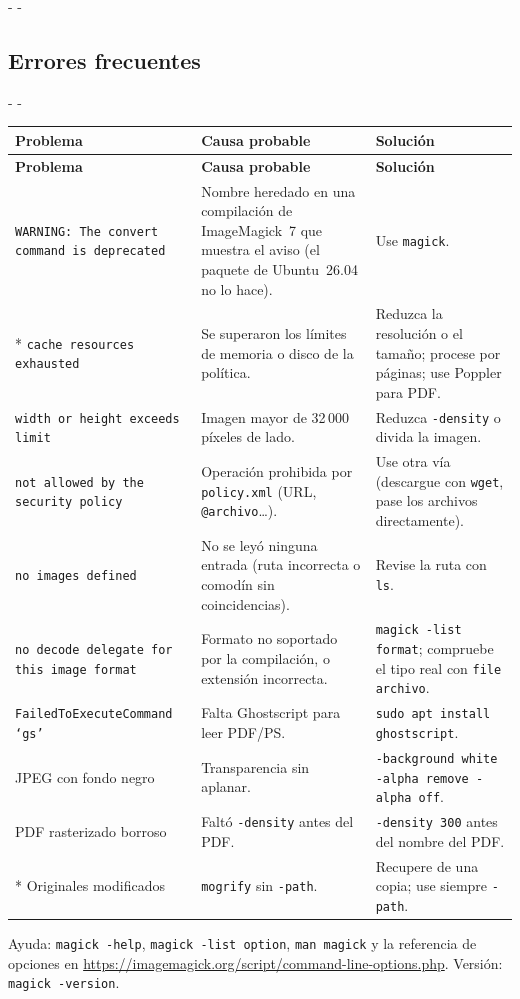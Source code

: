 \documentclass[11pt,a4paper]{article}
\makeatletter
\newcommand{\necesitaespacio}[1]{\par\penalty-100\begingroup
	\setlength{\dimen@}{#1}\dimen@ii\pagegoal\advance\dimen@ii-\pagetotal
	\ifdim\dimen@>\dimen@ii\ifdim\dimen@ii>\z@\vfil\fi\penalty-\@M\fi\endgroup}
\newenvironment{errores}{%
	\par\begingroup\small
	\begin{longtable}{L{4.1cm}L{4.9cm}L{6.0cm}}
		\toprule\rowcolor{tablacab}\cab{Problema} & \cab{Causa probable} & \cab{Solución} \\ \midrule
		\endfirsthead
		\toprule\rowcolor{tablacab}\cab{Problema} & \cab{Causa probable} & \cab{Solución} \\ \midrule
		\endhead
		\bottomrule
		\endfoot}
	{\end{longtable}\endgroup}
\newcommand{\cmd}[1]{\texttt{\textcolor{colcmd}{#1}}}      %
\newcommand{\opt}[1]{\texttt{\textcolor{colopt}{#1}}}      %
\newcommand{\arch}[1]{\texttt{\textcolor{colarch}{#1}}}    %
\newcommand{\cab}[1]{\textbf{#1}}
\makeatother
\begin{document}
	\necesitaespacio{14\baselineskip}
	\subsection{Errores frecuentes}
	
	\necesitaespacio{10\baselineskip}
	\begin{errores}
		\texttt{WARNING: The convert command is deprecated} & Nombre heredado en una compilación de ImageMagick~7 que muestra el aviso (el paquete de Ubuntu~26.04 no lo hace). & Use \cmd{magick}.\\*
		\texttt{cache resources exhausted} & Se superaron los límites de memoria o disco de la política. & Reduzca la resolución o el tamaño; procese por páginas; use Poppler para PDF.\\
		\texttt{width or height exceeds limit} & Imagen mayor de 32\,000 píxeles de lado. & Reduzca \opt{-density} o divida la imagen.\\
		\texttt{not allowed by the security policy} & Operación prohibida por \arch{policy.xml} (URL, \arch{@archivo}\ldots). & Use otra vía (descargue con \cmd{wget}, pase los archivos directamente).\\
		\texttt{no images defined} & No se leyó ninguna entrada (ruta incorrecta o comodín sin coincidencias). & Revise la ruta con \cmd{ls}.\\
		\texttt{no decode delegate for this image format} & Formato no soportado por la compilación, o extensión incorrecta. & \cmd{magick -list format}; compruebe el tipo real con \cmd{file archivo}.\\
		\texttt{FailedToExecuteCommand `gs'} & Falta Ghostscript para leer PDF/PS. & \cmd{sudo apt install ghostscript}.\\
		JPEG con fondo negro & Transparencia sin aplanar. & \opt{-background white -alpha remove -alpha off}.\\
		PDF rasterizado borroso & Faltó \opt{-density} antes del PDF. & \opt{-density 300} antes del nombre del PDF.\\*
		Originales modificados & \cmd{mogrify} sin \opt{-path}. & Recupere de una copia; use siempre \opt{-path}.\\
	\end{errores}
	
	Ayuda: \cmd{magick -help}, \cmd{magick -list option}, \cmd{man magick} y la referencia de opciones en \url{https://imagemagick.org/script/command-line-options.php}. Versión: \cmd{magick -version}.
	\clearpage
\end{document}
